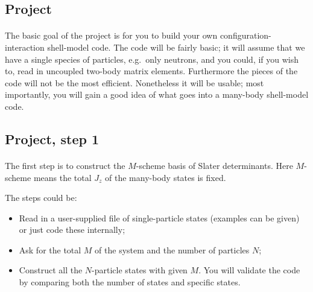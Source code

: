\documentclass[%
twoside,                 %
final,                   %
10pt]{article}
\begin{document}
\noindent



\subsection*{Project}

\paragraph{}
The basic goal of the project is for you to build your own configuration-interaction  shell-model 
code. The code will be fairly basic; it will assume that we have 
a single species of particles, e.g.~only neutrons, 
and you could, if you wish to,  read in uncoupled two-body matrix elements.  Furthermore the pieces of the code will not 
be the most efficient.  Nonetheless it will be usable; most importantly, you will gain a good idea of what goes into a many-body shell-model code.





\subsection*{Project, step 1}

\paragraph{}

The first step  is to construct the $M$-scheme basis of Slater determinants.
Here $M$-scheme means the total $J_z$ of the many-body states is fixed.

The steps could be:

\begin{itemize}
\item Read in a user-supplied file of single-particle states (examples can be given) or just code these internally;

\item Ask for the total $M$ of the system and the number of particles $N$;

\item Construct all the $N$-particle states with given $M$.  You will validate the code by  comparing both the number of states and specific states.
\end{itemize}
\end{document}
